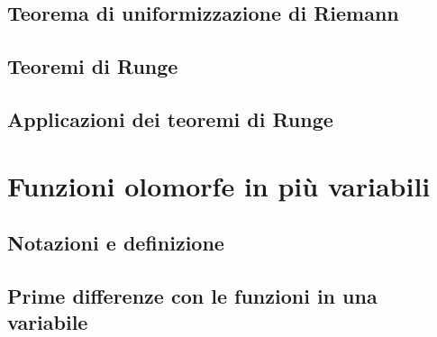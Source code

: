 \documentclass{article}
\begin{document}
\subsection{Teorema di uniformizzazione di Riemann}


\subsection{Teoremi di Runge}


\subsection{Applicazioni dei teoremi di Runge}


\newpage

\section{Funzioni olomorfe in più variabili}

\subsection{Notazioni e definizione}


\subsection{Prime differenze con le funzioni in una variabile}

\end{document}
